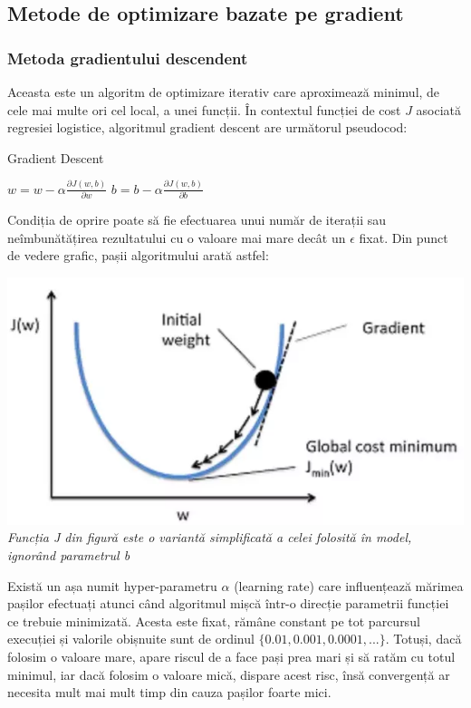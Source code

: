 \subsection{Metode de optimizare bazate pe gradient}
\subsubsection{Metoda gradientului descendent}

Aceasta este un algoritm de optimizare iterativ care aproximează minimul, de cele mai multe ori cel local, a unei funcții. În contextul funcției de cost $J$ asociată regresiei logistice, algoritmul gradient descent are următorul pseudocod:

\begin{algorithm}
\caption{Gradient Descent}
\begin{algorithmic}[1]
\State $w = w - \alpha\frac{\partial J(w,b)}{\partial w}$
\State $b = b - \alpha\frac{\partial J(w,b)}{\partial b}$
\EndWhile
\end{algorithmic}
\end{algorithm}

Condiția de oprire poate să fie efectuarea unui număr de iterații sau neîmbunătățirea rezultatului cu o valoare mai mare decât un $\epsilon$ fixat. Din punct de vedere grafic, pașii algoritmului arată astfel:

\begin{center}
\includegraphics[scale=0.5]{gradientDescent} \\
\textit{Funcția J din figură este o variantă simplificată a celei folosită în model, ignorând parametrul b}
\end{center}

Există un așa numit hyper-parametru $\alpha$ (learning rate) care influențează mărimea pașilor efectuați atunci când algoritmul mișcă într-o direcție parametrii funcției ce trebuie minimizată. Acesta este fixat, rămâne constant pe tot parcursul execuției și valorile obișnuite sunt de ordinul $\{0.01, 0.001, 0.0001, ...\}$. Totuși, dacă folosim o valoare mare, apare riscul de a face pași prea mari și să ratăm cu totul minimul, iar dacă folosim o valoare mică, dispare acest risc, însă convergență ar necesita mult mai mult timp din cauza pașilor foarte mici.

